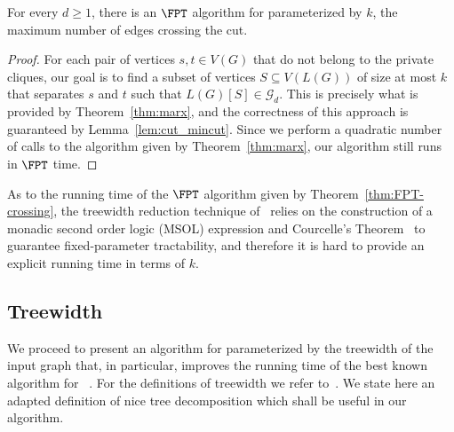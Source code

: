 \begin{theorem}\label{thm:FPT-crossing}
    For every $d \geq 1$, there is an $\FPT$ algorithm for  parameterized by $k$, the maximum number of edges crossing the cut.
\end{theorem}

\begin{proof}
    For each pair of vertices $s,t \in V(G)$ that do not belong to the private cliques, our goal is to find a subset of vertices $S \subseteq V(L(G))$ of size at most $k$ that separates $s$ and $t$ such that $L(G)[S] \in \mathcal{G}_d$.
    This is precisely what is provided by Theorem~\ref{thm:marx}, and the correctness of this approach is guaranteed by Lemma~\ref{lem:cut_mincut}.
    Since we perform a quadratic number of calls to the  algorithm given by Theorem~\ref{thm:marx}, our algorithm still runs in $\FPT$ time.
\end{proof}

As to the running time of the $\FPT$ algorithm given by Theorem~\ref{thm:FPT-crossing}, the treewidth reduction technique of~\cite{marx_treewidth_reduction} relies on the construction of a monadic second order logic (MSOL) expression and Courcelle's Theorem~\cite{courcelle_theorem} to guarantee fixed-parameter tractability, and therefore it is hard to provide an explicit running time in terms of $k$.

\subsection{Treewidth}
\label{thm:algo-tw}

We proceed to present an algorithm for  parameterized by the treewidth of the input graph that, in particular, improves the running time of the best known algorithm for ~\cite{matching_cut_structural}.
For the definitions of treewidth we refer to~\cite{treewidth,CyganFKLMPPS15}.
We state here an adapted definition of nice tree decomposition which shall be useful in our algorithm.




